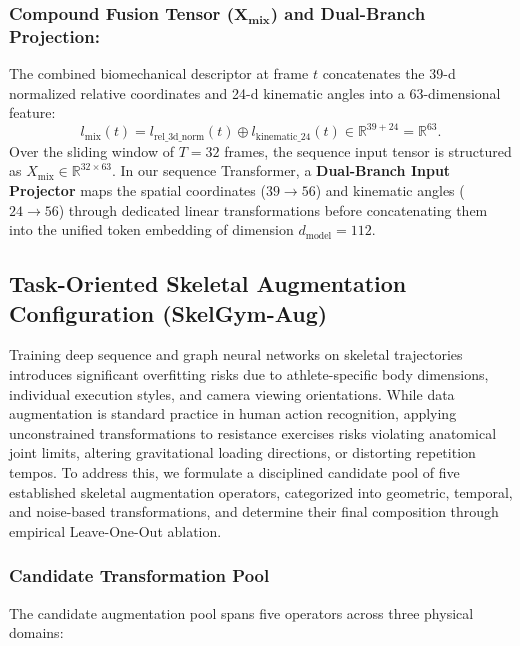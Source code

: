 \documentclass[runningheads]{llncs}
\begin{document}
\subsubsection{Compound Fusion Tensor ($\mathbf{X_{\text{mix}}}$) and Dual-Branch Projection:}
The combined biomechanical descriptor at frame $t$ concatenates the 39-d normalized relative coordinates and 24-d kinematic angles into a 63-dimensional feature:
\begin{equation}
    l_{\text{mix}}(t) = l_{\text{rel\_3d\_norm}}(t) \oplus l_{\text{kinematic\_24}}(t) \in \mathbb{R}^{39 + 24} = \mathbb{R}^{63}.
\end{equation}
Over the sliding window of $T = 32$ frames, the sequence input tensor is structured as $X_{\text{mix}} \in \mathbb{R}^{32 \times 63}$. In our sequence Transformer, a \textbf{Dual-Branch Input Projector} maps the spatial coordinates ($39 \to 56$) and kinematic angles ($24 \to 56$) through dedicated linear transformations before concatenating them into the unified token embedding of dimension $d_{\text{model}} = 112$.

\subsection{Task-Oriented Skeletal Augmentation Configuration (SkelGym-Aug)}
Training deep sequence and graph neural networks on skeletal trajectories introduces significant overfitting risks due to athlete-specific body dimensions, individual execution styles, and camera viewing orientations. While data augmentation is standard practice in human action recognition, applying unconstrained transformations to resistance exercises risks violating anatomical joint limits, altering gravitational loading directions, or distorting repetition tempos. To address this, we formulate a disciplined candidate pool of five established skeletal augmentation operators, categorized into geometric, temporal, and noise-based transformations, and determine their final composition through empirical Leave-One-Out ablation.

\subsubsection{Candidate Transformation Pool}
The candidate augmentation pool spans five operators across three physical domains:
\end{document}

